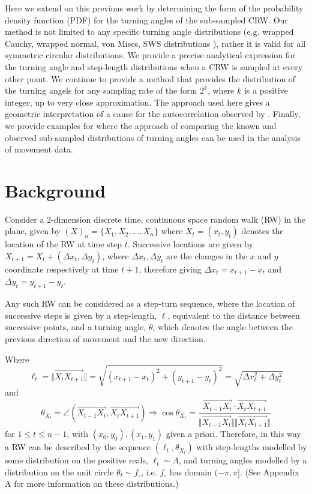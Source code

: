 \documentclass[english]{article}
\begin{document}
Here we extend on this previous work by determining the form of the probability density function (PDF) for the turning angles of the sub-sampled CRW.  Our method is not limited to any specific turning angle distributions (e.g. wrapped Cauchy, wrapped normal, von Mises, SWS distributions \citep{jammalamadaka2001topics}), rather it is valid for all symmetric circular distributions.  We provide a precise analytical expression for the turning angle and step-length distributions when a CRW is sampled at every other point.  We continue to provide a method that provides the distribution of the turning angels for any sampling rate of the form $2^k$, where $k$ is a positive integer, up to very close approximation. The approach used here gives a geometric interpretation of a cause for the autocorrelation observed by \citet{nams2013sampling}. Finally, we provide examples for where the approach of comparing the known and observed sub-sampled distributions of turning angles can be used in the analysis of movement data.

\section{Background}
Consider a 2-dimension discrete time, continuous space random walk (RW) in the plane, given by $\left(X\right)_{n}=\{X_{1},X_{2},\ldots,X_{n}\}$ where $X_{t}=(x_{t},y_{t})$ denotes the location of the RW at time step $t$.  Successive locations are given by $X_{t+1}=X_t+(\Delta x_t, \Delta y_t)$, where $\Delta x_t, \Delta y_t$ are the changes in the $x$ and $y$ coordinate respectively at time $t+1$, therefore giving $\Delta x_t= x_{t+1}-x_t$ and $\Delta y_t= y_{t+1}-y_t$.

Any such RW can be considered as a step-turn sequence, where the location of successive steps is given by a step-length, $\ell$, equivalent to the distance between successive points, and a turning angle, $\theta$, which denotes the angle between the previous direction of movement and the new direction.  

Where
\begin{equation}
\ell_{t}=\Vert\overrightarrow{X_{t}X_{t+1}}\Vert=\sqrt{(x_{t+1}-x_{t})^{2}+\left(y_{t+1}-y_{t}\right)^{2}}=\sqrt{\Delta x_t^2+\Delta y_t^2}
\end{equation}
and 
\begin{equation}
 \theta_{X_t}= \angle\left(\overrightarrow{X_{t-1}X_{t}},\overrightarrow{X_{t}X_{t+1}}\right) \Rightarrow \cos\theta_{X_t}=\frac{\overrightarrow{X_{t-1}X_{t}}\cdot\overrightarrow{X_{t}X_{t+1}}}{\Vert\overrightarrow{X_{t-1}X_{t}}\Vert\Vert\overrightarrow{X_{t}X_{t+1}}\Vert}
\end{equation}
for $1\leq t \leq n-1$, with $(x_0,y_0), (x_1,y_1)$ given a priori.  Therefore, in this way a RW can be described by the sequence $(\ell_t,\theta_{X_t})$ with step-lengths modelled by some distribution on the positive reals, $\ell_t\sim \Lambda$, and turning angles modelled by a distribution on the unit circle $\theta_t\sim f_\circ$, i.e. $f_\circ$ has domain $(-\pi,\pi]$. (See Appendix A for more information on these distributions.)
\end{document}
